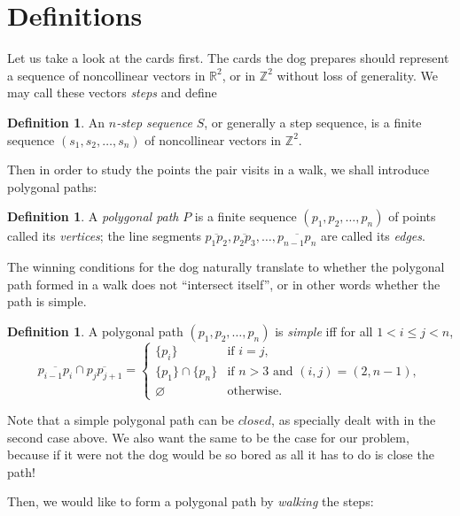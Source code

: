 \documentclass{amsart}
\theoremstyle{definition}
\newtheorem{definition}[proposition]{Definition}
\theoremstyle{problem}
\theoremstyle{remark}
\begin{document}
\section{Definitions}

Let us take a look at the cards first. The cards the dog prepares should represent
a sequence of noncollinear vectors in $\mathbb{R}^2$, or in $\mathbb{Z}^2$
without loss of generality. We may call these vectors \emph{steps} and define

\begin{definition}
    An \emph{$n$-step sequence} $S$, or generally a step sequence,
    is a finite sequence $(s_1,s_2,\dots,s_n)$
    of noncollinear vectors in $\mathbb{Z}^2$.
\end{definition}

Then in order to study the points the pair visits in a walk, we shall introduce
polygonal paths:

\begin{definition}
    A \emph{polygonal path} $P$ is a finite sequence $(p_1,p_2,\dots,p_n)$
    of points called its \emph{vertices}; the line segments
    $\overline{p_1p_2},\overline{p_2p_3},\dots,\overline{p_{n-1}p_n}$
    are called its \emph{edges}.
\end{definition}

The winning conditions for the dog naturally translate to whether the polygonal
path formed in a walk does not ``intersect itself'', or in other words whether
the path is simple.

\begin{definition}
    A polygonal path $(p_1,p_2,\dots,p_n)$ is \emph{simple}
    iff for all $1<i\le j<n$,
    \[
        \overline{p_{i-1}p_i}\cap\overline{p_jp_{j+1}}=
        \begin{cases}
            \{p_i\}            & \text{if $i=j$},                     \\
            \{p_1\}\cap\{p_n\} & \text{if $n>3$ and $(i,j)=(2,n-1)$}, \\
            \varnothing        & \text{otherwise}.
        \end{cases}
    \]
\end{definition}

Note that a simple polygonal path can be $closed$, as specially dealt with
in the second case above. We also want the same to be the case for our problem,
because if it were not the dog would be so bored as all it has to do is close the path!

Then, we would like to form a polygonal path by \emph{walking} the steps:
\end{document}
